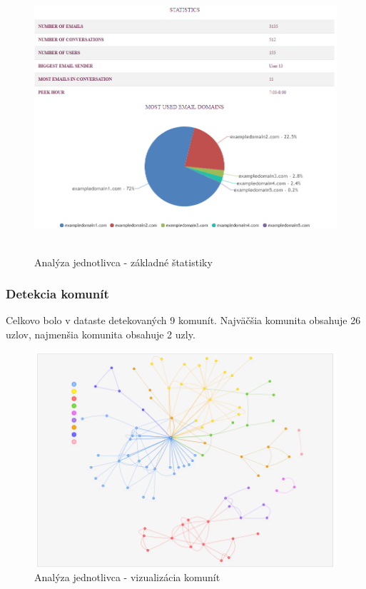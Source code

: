 \documentclass[slovak,master,public,dept460,male,cpdeclaration,oneside]{diploma}
\begin{document}
\begin{figure}[H]
\centering
\includegraphics[width=13cm, height=10cm]{figures/analyza_jednotlivca_stat}
\caption{Analýza jednotlivca - základné štatistiky}
\label{analyza_jednotlivca_stat}
\end{figure}


\subsubsection{Detekcia komunít}
Celkovo bolo v dataste detekovaných 9 komunít. Najväčšia komunita obsahuje 26 uzlov, najmenšia komunita obsahuje 2 uzly. 

\begin{figure}[H]
\centering
\includegraphics[width=12cm, height=8cm]{figures/analyza_jednotlivca_komunity}
\caption{Analýza jednotlivca - vizualizácia komunít}
\label{analyza_jednotlivca_stat}
\end{figure}
\end{document}
